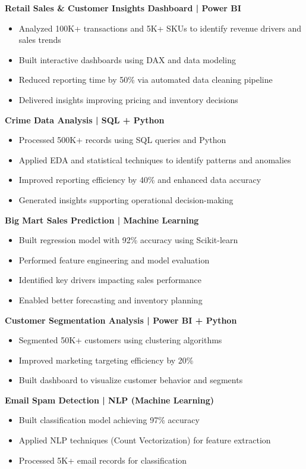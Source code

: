 \documentclass[letterpaper,11pt]{article}
\begin{document}
\textbf{Retail Sales \& Customer Insights Dashboard | Power BI}
\begin{itemize}[leftmargin=*]
\item Analyzed 100K+ transactions and 5K+ SKUs to identify revenue drivers and sales trends
\item Built interactive dashboards using DAX and data modeling
\item Reduced reporting time by 50\% via automated data cleaning pipeline
\item Delivered insights improving pricing and inventory decisions
\end{itemize}

\textbf{Crime Data Analysis | SQL + Python}
\begin{itemize}[leftmargin=*]
\item Processed 500K+ records using SQL queries and Python
\item Applied EDA and statistical techniques to identify patterns and anomalies
\item Improved reporting efficiency by 40\% and enhanced data accuracy
\item Generated insights supporting operational decision-making
\end{itemize}

\textbf{Big Mart Sales Prediction | Machine Learning}
\begin{itemize}[leftmargin=*]
\item Built regression model with 92\% accuracy using Scikit-learn
\item Performed feature engineering and model evaluation
\item Identified key drivers impacting sales performance
\item Enabled better forecasting and inventory planning
\end{itemize}

\textbf{Customer Segmentation Analysis | Power BI + Python}
\begin{itemize}[leftmargin=*]
\item Segmented 50K+ customers using clustering algorithms
\item Improved marketing targeting efficiency by 20\%
\item Built dashboard to visualize customer behavior and segments
\end{itemize}

\textbf{Email Spam Detection | NLP (Machine Learning)}
\begin{itemize}[leftmargin=*]
\item Built classification model achieving 97\% accuracy
\item Applied NLP techniques (Count Vectorization) for feature extraction
\item Processed 5K+ email records for classification
\end{itemize}
\end{document}
